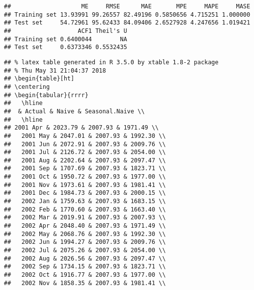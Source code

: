 \documentclass[]{article}
\begin{document}
\begin{verbatim}
##                    ME     RMSE      MAE       MPE     MAPE     MASE
## Training set 13.93991 99.26557 82.49196 0.5850656 4.715251 1.000000
## Test set     54.72961 95.62433 84.09406 2.6527928 4.247656 1.019421
##                   ACF1 Theil's U
## Training set 0.6400044        NA
## Test set     0.6373346 0.5532435
\end{verbatim}

\begin{verbatim}
## % latex table generated in R 3.5.0 by xtable 1.8-2 package
## % Thu May 31 21:04:37 2018
## \begin{table}[ht]
## \centering
## \begin{tabular}{rrrr}
##   \hline
##  & Actual & Naive & Seasonal.Naive \\ 
##   \hline
## 2001 Apr & 2023.79 & 2007.93 & 1971.49 \\ 
##   2001 May & 2047.01 & 2007.93 & 1992.30 \\ 
##   2001 Jun & 2072.91 & 2007.93 & 2009.76 \\ 
##   2001 Jul & 2126.72 & 2007.93 & 2054.00 \\ 
##   2001 Aug & 2202.64 & 2007.93 & 2097.47 \\ 
##   2001 Sep & 1707.69 & 2007.93 & 1823.71 \\ 
##   2001 Oct & 1950.72 & 2007.93 & 1977.00 \\ 
##   2001 Nov & 1973.61 & 2007.93 & 1981.41 \\ 
##   2001 Dec & 1984.73 & 2007.93 & 2000.15 \\ 
##   2002 Jan & 1759.63 & 2007.93 & 1683.15 \\ 
##   2002 Feb & 1770.60 & 2007.93 & 1663.40 \\ 
##   2002 Mar & 2019.91 & 2007.93 & 2007.93 \\ 
##   2002 Apr & 2048.40 & 2007.93 & 1971.49 \\ 
##   2002 May & 2068.76 & 2007.93 & 1992.30 \\ 
##   2002 Jun & 1994.27 & 2007.93 & 2009.76 \\ 
##   2002 Jul & 2075.26 & 2007.93 & 2054.00 \\ 
##   2002 Aug & 2026.56 & 2007.93 & 2097.47 \\ 
##   2002 Sep & 1734.15 & 2007.93 & 1823.71 \\ 
##   2002 Oct & 1916.77 & 2007.93 & 1977.00 \\ 
##   2002 Nov & 1858.35 & 2007.93 & 1981.41 \\ 

\end{verbatim}
\end{document}
